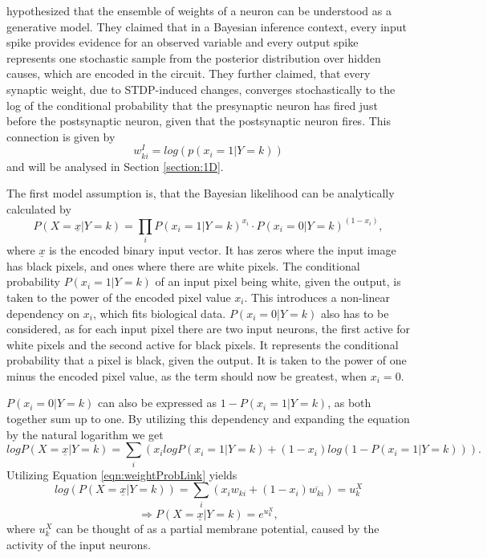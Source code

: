 \citet{nessler} hypothesized that the ensemble of weights of a neuron can be understood as a generative model. They claimed that in a Bayesian inference context, every input spike provides evidence for an observed variable and every output spike represents one stochastic sample from the posterior distribution over hidden causes, which are encoded in the circuit. They further claimed, that every synaptic weight, due to STDP-induced changes,  converges stochastically to the log of the conditional probability that the presynaptic neuron has fired just before the postsynaptic neuron, given that the postsynaptic neuron fires. This connection is given by
\begin{equation}
\label{eqn:weightProbLink}
 w^{I}_{ki} = log(p(x_i = 1 | Y = k))
\end{equation}
and will be analysed in Section \ref{section:1D}.

The first model assumption is, that the Bayesian likelihood can be analytically calculated by
\begin{equation}
\label{eqn:P1}
P(X=\underline{x}|Y=k) = \prod_i P(x_i=1|Y=k)^{x_i} \cdot P(x_i=0|Y=k)^{(1-x_i)},
\end{equation}
where $\underline{x}$ is the encoded binary input vector. It has zeros where the input image has black pixels, and ones where there are white pixels. The conditional probability $P(x_i=1|Y=k)$ of an input pixel being white, given the output, is taken to the power of the encoded pixel value $x_i$. This introduces a non-linear dependency on $x_i$, which fits biological data. $P(x_i=0|Y=k)$ also has to be considered, as for each input pixel there are two input neurons, the first active for white pixels and the second active for black pixels. It represents the conditional probability that a pixel is black, given the output. It is taken to the power of one minus the encoded pixel value, as the term should now be greatest, when $x_i = 0$.

$P(x_i=0|Y=k)$ can also be expressed as $1 - P(x_i=1|Y=k)$, as both together sum up to one. By utilizing this dependency and  expanding the equation by the natural logarithm we get
\begin{equation}
log P(X=\underline{x}|Y=k) = \sum_i (x_i log P(x_i=1|Y=k) + (1-x_i) log (1 - P(x_i=1|Y=k))).
\end{equation}
Utilizing Equation \ref{eqn:weightProbLink} yields
\begin{equation}
log(P(X=\underline{x}|Y=k)) = \sum_i (x_i w_{ki} + (1-x_i)\overline{w_{ki}}) = u^X_k
\end{equation}
\begin{equation}
\Rightarrow P(X=\underline{x}|Y=k) = e^{u^X_k},
\end{equation}
where $u^X_k$ can be thought of as a partial membrane potential, caused by the activity of the input neurons.

